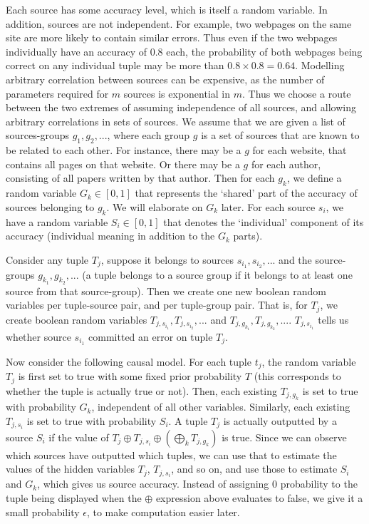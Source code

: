 \documentclass{sig-alternate}
\newcounter{prob}
\begin{document}
Each source has some accuracy level, which is itself a random variable. In addition, sources are not independent. For example, two webpages on the same site are more likely to contain similar errors. Thus even if the two webpages individually have an accuracy of $0.8$ each, the probability of both webpages being correct on any individual tuple may be more than $0.8 \times 0.8 = 0.64$. Modelling arbitrary  correlation between sources can be expensive, as the number of parameters required for $m$ sources is exponential in $m$. Thus we choose a route between the two extremes of assuming independence of all sources, and allowing arbitrary correlations in sets of sources. We assume that we are given a list of sources-groups $g_1, g_2, ...$, where each group $g$ is a set of sources that are known to be related to each other. For instance, there may be a $g$ for each website, that contains all pages on that website. Or there may be a $g$ for each author, consisting of all papers written by that author. Then for each $g_k$, we define a random variable $G_k \in [0,1]$ that represents the `shared' part of the accuracy of sources belonging to $g_k$. We will elaborate on $G_k$ later. For each source $s_i$, we have a random variable $S_i \in [0,1]$ that denotes the `individual' component of its accuracy (individual meaning in addition to the $G_k$ parts). 

Consider any tuple $T_j$, suppose it belongs to sources $s_{i_1}, s_{i_2}, ... $ and the source-groups $g_{k_1}, g_{k_2}, ...$ (a tuple belongs to a source group if it belongs to at least one source from that source-group). Then we create one new boolean random variables per tuple-source pair, and per tuple-group pair. That is, for $T_j$, we create boolean random variables $T_{j, s_{i_1}}, T_{j, s_{i_2}}, ...$ and $T_{j,g_{k_1}}, T_{j, g_{k_2}}, ...$. $T_{j, s_{i_1}}$ tells us whether source $s_{i_1}$ committed an error on tuple $T_j$. 

Now consider the following causal model. For each tuple $t_j$, the random variable $T_j$ is first set to true with some fixed prior probability $T$ (this corresponds to whether the tuple is actually true or not). Then, each existing $T_{j, g_k}$ is set to true with probability $G_k$, independent of all other variables. Similarly, each existing $T_{j, s_i}$ is set to true with probability $S_i$. A tuple $T_j$ is actually outputted by a source $S_i$ if the value of $T_j \oplus T_{j, s_i} \oplus(\bigoplus_{k} T_{j, g_k})$ is true. Since we can observe which sources have outputted which tuples, we can use that to estimate the values of the hidden variables $T_j$, $T_{j, s_i}$, and so on, and use those to estimate $S_i$ and $G_k$, which gives us source accuracy. Instead of assigning $0$ probability to the tuple being displayed when the $\oplus$ expression above evaluates to false, we give it a small probability $\epsilon$, to make computation easier later.
\end{document}
